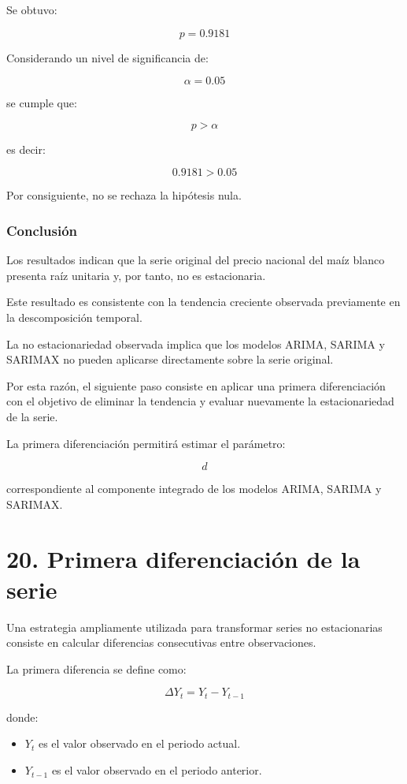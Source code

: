 \documentclass[11pt]{article}
\providecommand{\tightlist}{%
      \setlength{\itemsep}{0pt}\setlength{\parskip}{0pt}}
\begin{document}
Se obtuvo:

\[
p=0.9181
\]

Considerando un nivel de significancia de:

\[
\alpha = 0.05
\]

se cumple que:

\[
p > \alpha
\]

es decir:

\[
0.9181 > 0.05
\]

Por consiguiente, no se rechaza la hipótesis nula.

\hypertarget{conclusiuxf3n}{%
\subsubsection{Conclusión}\label{conclusiuxf3n}}

Los resultados indican que la serie original del precio nacional del
maíz blanco presenta raíz unitaria y, por tanto, no es estacionaria.

Este resultado es consistente con la tendencia creciente observada
previamente en la descomposición temporal.

La no estacionariedad observada implica que los modelos ARIMA, SARIMA y
SARIMAX no pueden aplicarse directamente sobre la serie original.

Por esta razón, el siguiente paso consiste en aplicar una primera
diferenciación con el objetivo de eliminar la tendencia y evaluar
nuevamente la estacionariedad de la serie.

La primera diferenciación permitirá estimar el parámetro:

\[
d
\]

correspondiente al componente integrado de los modelos ARIMA, SARIMA y
SARIMAX.

    \hypertarget{primera-diferenciaciuxf3n-de-la-serie}{%
\section{20. Primera diferenciación de la
serie}\label{primera-diferenciaciuxf3n-de-la-serie}}

Una estrategia ampliamente utilizada para transformar series no
estacionarias consiste en calcular diferencias consecutivas entre
observaciones.

La primera diferencia se define como:

\[
\Delta Y_t = Y_t - Y_{t-1}
\]

donde:

\begin{itemize}
\tightlist
\item
  \(Y_t\) es el valor observado en el periodo actual.
\item
  \(Y_{t-1}\) es el valor observado en el periodo anterior.
\end{itemize}
\end{document}
